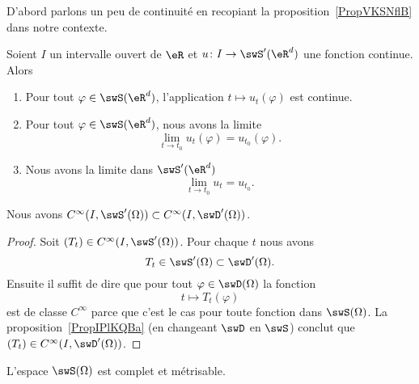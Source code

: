 D'abord parlons un peu de continuité en recopiant la proposition~\ref{PropVKSNflB} dans notre contexte.
\begin{proposition}     \label{PropBXFmvPs}
    Soient \( I\) un intervalle ouvert de \( \eR\) et \( u\colon I\to \swS'(\eR^d)\) une fonction continue. Alors
    \begin{enumerate}
        \item   \label{ItemFTvVUEW}
            Pour tout \( \varphi\in\swS(\eR^d)\), l'application \( t\mapsto u_t(\varphi)\) est continue.
        \item
            Pour tout \( \varphi\in\swS(\eR^d)\), nous avons la limite
            \begin{equation}
                \lim_{t\to t_0} u_t(\varphi)=u_{t_0}(\varphi).
            \end{equation}
        \item
            Nous avons la limite dans \( \swS'(\eR^d)\)
            \begin{equation}
                \lim_{t\to t_0} u_t=u_{t_0}.
            \end{equation}
    \end{enumerate}
\end{proposition}

\begin{lemma}
    Nous avons \(  C^{\infty}(I,\swS'(\Omega))\subset C^{\infty}(I,\swD'(\Omega))\).
\end{lemma}

\begin{proof}
    Soit \( (T_t)\in C^{\infty}(I,\swS'(\Omega))\). Pour chaque \( t\) nous avons
    \begin{equation}
        T_t\in\swS'(\Omega)\subset\swD'(\Omega).
    \end{equation}
    Ensuite il suffit de dire que pour tout \( \varphi\in\swD(\Omega)\) la fonction
    \begin{equation}
        t\mapsto T_t(\varphi)
    \end{equation}
    est de classe \(  C^{\infty}\) parce que c'est le cas pour toute fonction dans \( \swS(\Omega)\). La proposition~\ref{PropIPlKQBa} (en changeant \( \swD\) en \( \swS\)) conclut que \( (T_t)\in C^{\infty}(I,\swD'(\Omega))\).
\end{proof}

\begin{proposition} \label{PropIIAcyDq}
    L'espace \( \swS(\Omega)\) est complet et métrisable.
\end{proposition}

